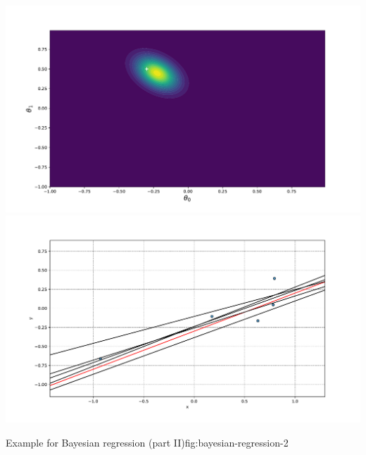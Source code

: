 \begin{frame}
{\begin{minipage}{0.45\textwidth}
			\includegraphics[scale=0.17]{18_advanced_regression/02_img/posterior_5} \\[-2mm]
			\includegraphics[scale=0.17]{18_advanced_regression/02_img/samples_5}
		\end{minipage}
	}{Example for Bayesian regression (part II)}{fig:bayesian-regression-2}
\end{frame}


